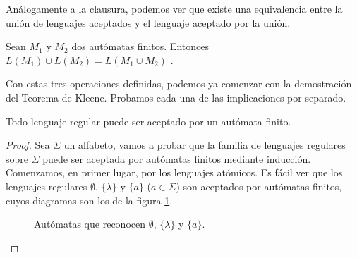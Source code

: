 Análogamente a la clausura, podemos ver que existe una equivalencia entre la unión de lenguajes aceptados y el lenguaje
aceptado por la unión.

\begin{proposicion}Sean $M_1$ y $M_2$ dos autómatas finitos. Entonces $L(M_1)\cup L(M_2)=L(M_1\cup M_2)$ 
\cite{union_auto}. \label{prop:union-auto}
\end{proposicion}

Con estas tres operaciones definidas, podemos ya comenzar con la demostración del Teorema de Kleene. Probamos cada una
de las implicaciones por separado.

\begin{lema}Todo lenguaje regular puede ser aceptado por un autómata finito.
\end{lema}
\begin{proof}
Sea $\Sigma$ un alfabeto, vamos a probar que la familia de lenguajes regulares sobre $\Sigma$ puede ser aceptada por
autómatas finitos mediante inducción. Comenzamos, en primer lugar, por los lenguajes atómicos. Es fácil ver
que los lenguajes regulares $\emptyset$, $\{\lambda\}$ y $\{a\}$ ($a\in\Sigma$) son aceptados por autómatas finitos,
cuyos diagramas son los de la figura \ref{fig:afd-atomic}.

\begin{figure}[ht!]
     \centering
     \begin{subfigure}[b]{0.3\textwidth}
         \centering
     \end{subfigure}
     \begin{subfigure}[b]{0.3\textwidth}
         \centering
     \end{subfigure}
     \begin{subfigure}[b]{0.3\textwidth}
         \centering
     \end{subfigure}
        \caption{Autómatas que reconocen $\emptyset$, $\{\lambda\}$ y $\{a\}$.}
        \label{fig:afd-atomic}
\end{figure}


\end{proof}
